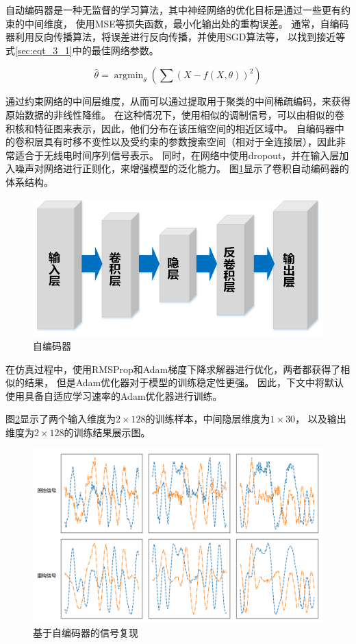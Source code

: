 自动编码器是一种无监督的学习算法，其中神经网络的优化目标是通过一些更有约束的中间维度，
使用MSE等损失函数，最小化输出处的重构误差。
通常，自编码器利用反向传播算法，将误差进行反向传播，并使用SGD算法等，
以找到接近等式\eqref{sec:eqt_3_1}中的最佳网络参数。

\begin{equation}\label{sec:eqt_3_1}
	\hat{\theta} = \mathop{\arg\min}_{\theta}(\sum(X − f (X,\theta))^2)
\end{equation}

通过约束网络的中间层维度，从而可以通过提取用于聚类的中间稀疏编码，来获得原始数据的非线性降维。
在这种情况下，使用相似的调制信号，可以由相似的卷积核和特征图来表示，因此，他们分布在该压缩空间的相近区域中。
自编码器中的卷积层具有时移不变性以及受约束的参数搜索空间（相对于全连接层），因此非常适合于无线电时间序列信号表示。
同时，在网络中使用dropout，并在输入层加入噪声对网络进行正则化，来增强模型的泛化能力。
图\ref{sec:fig_3_4}显示了卷积自动编码器的体系结构。

\begin{figure}[!h]
	\centering
	\includegraphics[scale=0.6]{figures/chapter_3/fig_3_4}
	\caption{自编码器}	\label{sec:fig_3_4}
\end{figure}
在仿真过程中，使用RMSProp和Adam梯度下降求解器进行优化，两者都获得了相似的结果，
但是Adam优化器对于模型的训练稳定性更强。
因此，下文中将默认使用具备自适应学习速率的Adam优化器进行训练。\par

图\ref{sec:fig_3_5}显示了两个输入维度为$2 \times 128$的训练样本，中间隐层维度为$1 \times 30$，
以及输出维度为$2 \times 128$的训练结果展示图。\par
\begin{figure}[!h]
	\centering
	\includegraphics[scale=0.6]{figures/chapter_3/fig_3_5}
	\caption{基于自编码器的信号复现}	\label{sec:fig_3_5}
\end{figure} 


